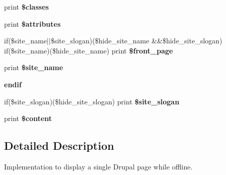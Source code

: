 \begin{DoxyCompactItemize}
\item 
\hypertarget{themes_2bartik_2templates_2maintenance-page_8tpl_8php_a6d48ecbdbc70ca1812e665169b5fa1e2}{
print {\bfseries \$classes}}
\label{themes_2bartik_2templates_2maintenance-page_8tpl_8php_a6d48ecbdbc70ca1812e665169b5fa1e2}

\item 
\hypertarget{themes_2bartik_2templates_2maintenance-page_8tpl_8php_a9c88c4272fa40546577b45392a0b3cd3}{
print {\bfseries \$attributes}}
\label{themes_2bartik_2templates_2maintenance-page_8tpl_8php_a9c88c4272fa40546577b45392a0b3cd3}

\item 
\hypertarget{themes_2bartik_2templates_2maintenance-page_8tpl_8php_aa5f46209c2b5c2478826789ee8cfcdc3}{
if(\$site\_\-name$|$$|$\$site\_\-slogan)(\$hide\_\-site\_\-name \&\&\$hide\_\-site\_\-slogan) if(\$site\_\-name)(\$hide\_\-site\_\-name) print {\bfseries \$front\_\-page}}
\label{themes_2bartik_2templates_2maintenance-page_8tpl_8php_aa5f46209c2b5c2478826789ee8cfcdc3}

\item 
\hypertarget{themes_2bartik_2templates_2maintenance-page_8tpl_8php_ad500e3900e86a2e78f15afbe44b1f849}{
print {\bfseries \$site\_\-name}}
\label{themes_2bartik_2templates_2maintenance-page_8tpl_8php_ad500e3900e86a2e78f15afbe44b1f849}

\item 
\hypertarget{themes_2bartik_2templates_2maintenance-page_8tpl_8php_a23ee86aed1476877fef66a815af410c5}{
{\bfseries endif}}
\label{themes_2bartik_2templates_2maintenance-page_8tpl_8php_a23ee86aed1476877fef66a815af410c5}

\item 
\hypertarget{themes_2bartik_2templates_2maintenance-page_8tpl_8php_a66d61f077bc746b3c164c574d28b3b8f}{
if(\$site\_\-slogan)(\$hide\_\-site\_\-slogan) print {\bfseries \$site\_\-slogan}}
\label{themes_2bartik_2templates_2maintenance-page_8tpl_8php_a66d61f077bc746b3c164c574d28b3b8f}

\item 
\hypertarget{themes_2bartik_2templates_2maintenance-page_8tpl_8php_ab7b7210f43aa78e34f0b202de894a74c}{
print {\bfseries \$content}}
\label{themes_2bartik_2templates_2maintenance-page_8tpl_8php_ab7b7210f43aa78e34f0b202de894a74c}

\end{DoxyCompactItemize}


\subsection{Detailed Description}
Implementation to display a single Drupal page while offline.

